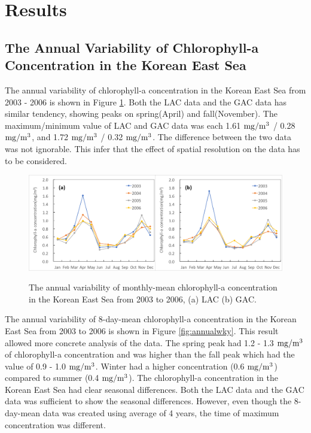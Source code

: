 
\section{Results}
 
\subsection{The Annual Variability of Chlorophyll-a Concentration in the Korean East Sea}
 
The annual variability of chlorophyll-a concentration in the Korean East Sea from 2003 - 2006 is shown in Figure \ref{fig:annualmon}. Both the LAC data and the GAC data has similar tendency, showing peaks on spring(April) and fall(November). The maximum/minimum value of LAC and GAC data was each 1.61 $\rm mg/m^3$ / 0.28 $\rm mg/m^3$, and 1.72 $\rm mg/m^3$ / 0.32 $\rm mg/m^3$. The difference between the two data was not ignorable. This infer that the effect of spatial resolution on the data has to be considered.
   
 \begin{figure}[b]
 	\centering
 	\includegraphics[width=1.0\linewidth]{../images/annualmon}\\
 	\caption{The annual variability of monthly-mean chlorophyll-a concentration in the Korean East Sea from 2003 to 2006, (a) LAC (b) GAC.}
 	\label{fig:annualmon}
 \end{figure}
 
The annual variability of 8-day-mean chlorophyll-a concentration in the Korean East Sea from 2003 to 2006 is shown in Figure \ref{fig:annualwky}. This result allowed more concrete analysis of the data. The spring peak had 1.2 - 1.3 $\rm mg/m^3$ of chlorophyll-a concentration and was higher than the fall peak which had the value of 0.9 - 1.0 $\rm mg/m^3$. Winter had a higher concentration (0.6 $\rm mg/m^3$) compared to summer (0.4 $\rm mg/m^3$). The chlorophyll-a concentration in the Korean East Sea had clear seasonal differences. Both the LAC data and the GAC data was sufficient to show the seasonal differences. However, even though the 8-day-mean data was created using average of 4 years, the time of maximum concentration was different. 

